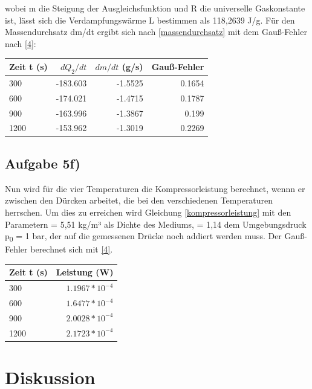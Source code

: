 \documentclass[titlepage=firstcover, captions=tableheading]{scrartcl}
\begin{document}
wobei m die Steigung der Ausgleichsfunktion und R die universelle Gaskonstante ist,
lässt sich die Verdampfungswärme L bestimmen als 118,2639 J/g.
Für den Massendurchsatz dm/dt ergibt sich nach \eqref{massendurchsatz} mit dem Gauß-Fehler nach \eqref{4}: 
\begin{center}
    \begin{tabular}{lrrr}
        \toprule
        {Zeit t (s)} & {$dQ_2/dt$} & {$dm/dt$ (g/s)} & {Gauß-Fehler} \\
        \midrule
        300 & -183.603 & -1.5525 & 0.1654\\
        600 & -174.021 & -1.4715 & 0.1787\\
        900 & -163.996 & -1.3867 & 0.199\\
        1200& -153.962 & -1.3019 & 0.2269\\
        \bottomrule
        
    \end{tabular}
\end{center}

\subsection{Aufgabe 5f)}

Nun wird für die vier Temperaturen die Kompressorleistung berechnet, wennn er zwischen den Dürcken arbeitet,
die bei den verschiedenen Temperaturen herrschen.
Um dies zu erreichen wird Gleichung \eqref{kompressorleistung} mit den Parametern \rho = 5,51 kg/m³ als Dichte des Mediums,
\kappa = 1,14
dem Umgebungsdruck p\textsubscript{0} = 1 bar, der auf die gemessenen Drücke noch addiert werden muss. 
Der Gauß-Fehler berechnet sich mit \ref{4}.
\begin{center}
    \begin{tabular}{lr}
        \toprule
        {Zeit t (s)}  & {Leistung (W)} \\
        \midrule
        300 & $1.1967*10^{-4}$ \\
        600 & $1.6477*10^{-4}$ \\
        900 &  $2.0028*10^{-4}$\\
        1200& $2.1723*10^{-4}$ \\
        \bottomrule
        
    \end{tabular}
\end{center}
\section{Diskussion}
\end{document}
